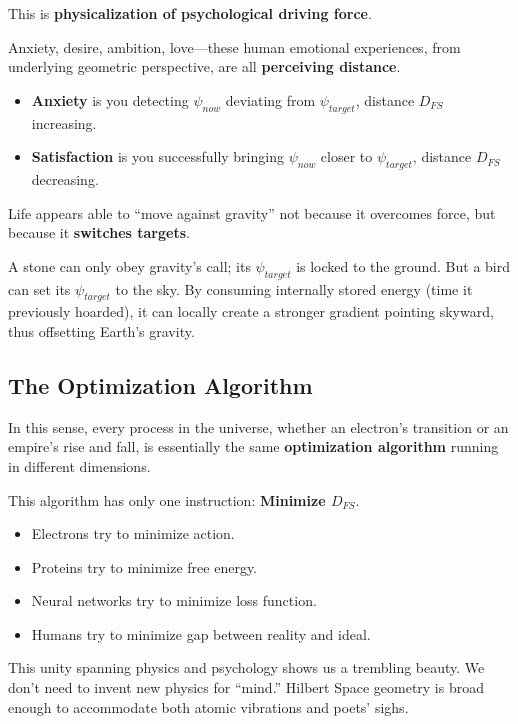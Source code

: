 \documentclass[11pt,a4paper,twoside]{book}
\begin{document}
This is \textbf{physicalization of psychological driving force}.

Anxiety, desire, ambition, love---these human emotional experiences, from underlying geometric perspective, are all \textbf{perceiving distance}.

\begin{itemize}
\item \textbf{Anxiety} is you detecting $\psi_{now}$ deviating from $\psi_{target}$, distance $D_{FS}$ increasing.

\item \textbf{Satisfaction} is you successfully bringing $\psi_{now}$ closer to $\psi_{target}$, distance $D_{FS}$ decreasing.
\end{itemize}

Life appears able to ``move against gravity'' not because it overcomes force, but because it \textbf{switches targets}.

A stone can only obey gravity's call; its $\psi_{target}$ is locked to the ground. But a bird can set its $\psi_{target}$ to the sky. By consuming internally stored energy (time it previously hoarded), it can locally create a stronger gradient pointing skyward, thus offsetting Earth's gravity.

\subsection{The Optimization Algorithm}

In this sense, every process in the universe, whether an electron's transition or an empire's rise and fall, is essentially the same \textbf{optimization algorithm} running in different dimensions.

This algorithm has only one instruction: \textbf{Minimize $D_{FS}$}.

\begin{itemize}
\item Electrons try to minimize action.

\item Proteins try to minimize free energy.

\item Neural networks try to minimize loss function.

\item Humans try to minimize gap between reality and ideal.
\end{itemize}

This unity spanning physics and psychology shows us a trembling beauty. We don't need to invent new physics for ``mind.'' Hilbert Space geometry is broad enough to accommodate both atomic vibrations and poets' sighs.
\end{document}
